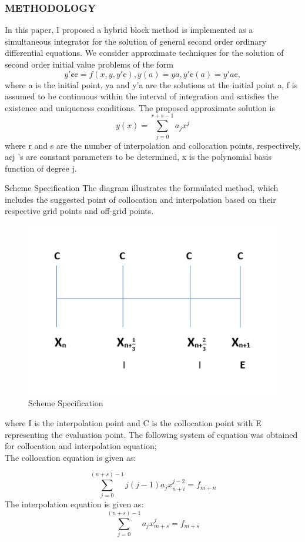 \documentclass[compress, 19pt, blue]{beamer}
\begin{document}
\begin{frame}
	\frametitle{\textbf{METHODOLOGY}}
	In this paper, I proposed a hybrid block method is implemented as a simultaneous integrator for the solution of general second order ordinary differential equations. We consider approximate techniques for the solution of second order initial value problems of the form
	\begin{equation}
	y'¢¢ = f (x, y, y'¢), y(a) = ya , y'¢(a) = y'a¢ ,						 		
	\end{equation}
	where a is the initial point, ya and y'a are the solutions at the initial point a, f is assumed to be continuous within the interval of integration and satisfies the existence and uniqueness conditions. The proposed approximate solution is
	\begin{equation}
	y(x) = \sum_{j=0}^{r+s-1}a_{j}x^{j}								
	\end{equation}
	where r and s are the number of interpolation and collocation points, respectively, a¢j ’s are constant parameters to be determined, x is the polynomial basis function of degree j.
\end{frame}



\begin{frame}{Scheme Specification}
\noindent The diagram illustrates the formulated method, which includes the suggested point of collocation and interpolation based on their respective grid points and off-grid points.

\begin{figure}[h]
	\centering
	\includegraphics[width=0.7\linewidth]{"main scheme"}
	\caption{Scheme Specification}
	\label{fig:main-scheme}
\end{figure}
\end{frame}


\begin{frame}
	\noindent where I is the interpolation point and C is the collocation point with E representing the evaluation point.
	The following system of equation was obtained for collocation and  interpolation equation;\\
	\noindent The collocation equation is given as:
	
	\begin{equation}
	\sum_{j=0}^{(n+s)-1} j(j-1)a_{j}x_{n+i}^{j-2}= f_{m+n}
	\end{equation}
	The interpolation equation is given as:
	\begin{equation}
	\sum_{j=0}^{(n+s)-1} a_{j}x_{m+s}^{j}= f_{m+s}
	\end{equation}
\end{frame}
\end{document}
